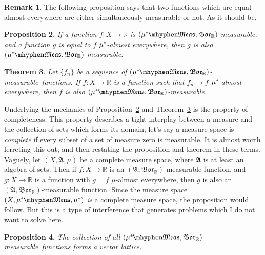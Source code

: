 \documentclass[
twoside=true,
paper=letter,
fontsize=9pt,
pagesize=auto,
leqno,
openany,
headsepline,
overfullrule,
]{scrbook}
\theoremstyle{plain}
\newtheorem{thm}{Theorem}[chapter]
\theoremstyle{plain}
\newtheorem{prop}[thm]{Proposition}
\theoremstyle{definition}
\newtheorem{rmk}[thm]{Remark}
\theoremstyle{bfnoteitalic}
\theoremstyle{bfnoteroman}
\newcommand{\sigalg}[1]{\mathfrak{#1}}
\newcommand{\borel}{\mathfrak{Bor}}
\newcommand{\R}{\mathbb{R}}
\newcommand{\sigmaalgebra}{\sigalg{A}}
\newcommand{\measurable}[1]{{#1}\mhyphen\mathfrak{Meas}}
\newcommand{\kernast}{\ast\kern-1pt}
\newcommand{\mbmeasurable}{$(\measurable{\measure^\kernast},\borel_\R)$\hyp{}measurable}
\newcommand{\function}{f}
\newcommand{\functionii}{g}
\newcommand{\measurespace}{X}
\newcommand{\measure}{\mu}
\begin{document}
\begin{rmk}
The following proposition says that two functions which are equal almost everywhere are either simultaneously measurable or not. As it should be.  
\end{rmk}



\begin{prop}\label{measurable_almost_everywhere}
If a function $\function:\measurespace\to\R$ is \mbmeasurable, and 
a function $\functionii$ is equal to $\function$
$\measure^\kernast$-almost everywhere, then $\functionii$ is also \mbmeasurable. 
\end{prop}




\begin{thm}\label{measurable_limits}
Let $\{f_n\}$ be a sequence of \mbmeasurable\ functions. If $f:\measurespace\to\R$ is a function such that $f_n\to f$ $\measure^\kernast$-almost everywhere, then $f$ is also \mbmeasurable.
\end{thm}




\begin{quoting}
\small
Underlying the mechanics of Proposition~\ref{measurable_almost_everywhere} and Theorem~\ref{measurable_limits} is the property of completeness. This property describes a tight interplay between a measure and the collection of sets which forms its domain; let's say a measure space is \emph{complete} if every subset of a set of measure zero is measurable. It is almost worth ferreting this out, and then restating the proposition and theorem in these terms.   Vaguely, let $(\measurespace, \sigmaalgebra, \measure)$ be a complete measure space, where $\sigmaalgebra$ is at least an algebra of sets. Then if $f:\measurespace\to\R$ is an 
$(\sigmaalgebra,\borel_\R)$\hyp{}measurable function, and $g:\measurespace\to\R$ is a function  with $g = f$ $\measure$\hyp{}almost everywhere, then $g$ is also an 
$(\sigmaalgebra,\borel_\R)$\hyp{}measurable function. Since the measure space 
$(\measurespace, \measurable{\measure^\kernast}, \measure^*)$ \emph{is} a complete measure space, the proposition would follow. But this is a type of interference that generates problems which I do not want to solve here.
\end{quoting}



\begin{prop}
The collection of all \mbmeasurable\ functions forms a vector lattice.
\end{prop}
\end{document}
